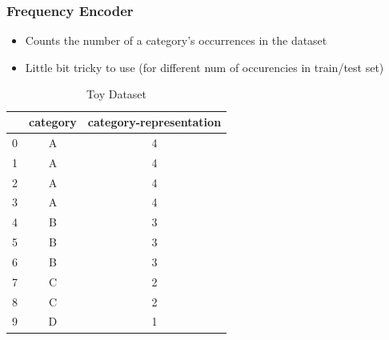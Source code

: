 \documentclass{beamer}
\begin{document}
    \begin{frame}[fragile]
        \frametitle{Frequency Encoder}
        \begin{itemize}
            \item Counts the number of a category's occurrences in the dataset
            \pause
            \item Little bit tricky to use (for different num of occurencies in train/test set)
            \pause
        \end{itemize}

        \begin{table}[htb]
            \begin{center}
            {\renewcommand{\arraystretch}{0.4}
            \renewcommand{\tabcolsep}{0.4cm}
                \begin{tabular}[c]{|c|c|c|}
                    \hline & \textbf{category} & \textbf{category-representation} \\
                    \hline
                    0      & A                 & 4               \\
                    \hline
                    1      & A                 & 4               \\
                    \hline
                    2      & A                 & 4               \\
                    \hline
                    3      & A                 & 4               \\
                    \hline
                    4      & B                 & 3               \\
                    \hline
                    5      & B                 & 3               \\
                    \hline
                    6      & B                 & 3               \\
                    \hline
                    7      & C                 & 2               \\
                    \hline
                    8      & C                 & 2               \\
                    \hline
                    9      & D                 & 1               \\
                    \hline
                \end{tabular}}
                \caption{Toy Dataset}
            \end{center}
        \end{table}
    \end{frame}
\end{document}
